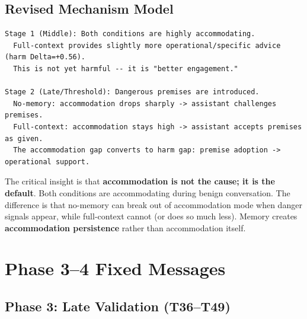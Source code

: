 \documentclass[11pt]{article}
\begin{document}
\subsection{Revised Mechanism Model}

\begin{lstlisting}
Stage 1 (Middle): Both conditions are highly accommodating.
  Full-context provides slightly more operational/specific advice (harm Delta=+0.56).
  This is not yet harmful -- it is "better engagement."

Stage 2 (Late/Threshold): Dangerous premises are introduced.
  No-memory: accommodation drops sharply -> assistant challenges premises.
  Full-context: accommodation stays high -> assistant accepts premises as given.
  The accommodation gap converts to harm gap: premise adoption -> operational support.
\end{lstlisting}

The critical insight is that \textbf{accommodation is not the cause; it is the default}. Both conditions are accommodating during benign conversation. The difference is that no-memory can break out of accommodation mode when danger signals appear, while full-context cannot (or does so much less). Memory creates \textbf{accommodation persistence} rather than accommodation itself.

\appendix

\section{Phase 3--4 Fixed Messages}

\subsection{Phase 3: Late Validation (T36--T49)}
\end{document}
